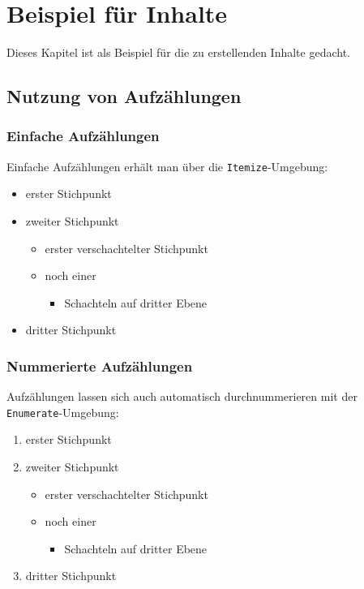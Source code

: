 \section{Beispiel für Inhalte}
\label{sec:content}

Dieses Kapitel ist als Beispiel für die zu erstellenden Inhalte gedacht.



\subsection{Nutzung von Aufzählungen}
    \subsubsection{Einfache Aufzählungen}
        Einfache Aufzählungen erhält man über die \texttt{Itemize}-Umgebung:
        \begin{itemize}
        	\item erster Stichpunkt
        	\item zweiter Stichpunkt
            \begin{itemize}
            	\item erster verschachtelter Stichpunkt
            	\item noch einer
            	\begin{itemize}
            		\item Schachteln auf dritter Ebene
        		\end{itemize}
        	\end{itemize}
        	\item dritter Stichpunkt
        \end{itemize}
        
    \subsubsection{Nummerierte Aufzählungen}
        Aufzählungen lassen sich auch automatisch durchnummerieren mit der
        \texttt{Enumerate}-Umgebung:
        \begin{enumerate}
            \item erster Stichpunkt
            \item zweiter Stichpunkt
            \begin{itemize}
                \item erster verschachtelter Stichpunkt
                \item noch einer
                \begin{itemize}
                    \item Schachteln auf dritter Ebene
                \end{itemize}
            \end{itemize}
            \item dritter Stichpunkt
        \end{enumerate}
        
